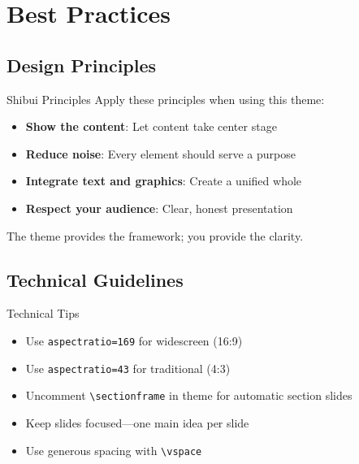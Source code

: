 \documentclass[aspectratio=169]{beamer}
\begin{document}
\section{Best Practices}

\subsection{Design Principles}

\begin{frame}{Shibui Principles}
  Apply these principles when using this theme:

  \begin{itemize}
    \item \textbf{Show the content}: Let content take center stage
    \item \textbf{Reduce noise}: Every element should serve a purpose
    \item \textbf{Integrate text and graphics}: Create a unified whole
    \item \textbf{Respect your audience}: Clear, honest presentation
  \end{itemize}

  \vspace{1em}

  The theme provides the framework; you provide the clarity.
\end{frame}

\subsection{Technical Guidelines}

\begin{frame}{Technical Tips}
  \begin{itemize}
    \item Use \texttt{aspectratio=169} for widescreen (16:9)
    \item Use \texttt{aspectratio=43} for traditional (4:3)
    \item Uncomment \texttt{\textbackslash sectionframe} in theme for automatic section slides
    \item Keep slides focused---one main idea per slide
    \item Use generous spacing with \texttt{\textbackslash vspace}
  \end{itemize}
\end{frame}
\end{document}
